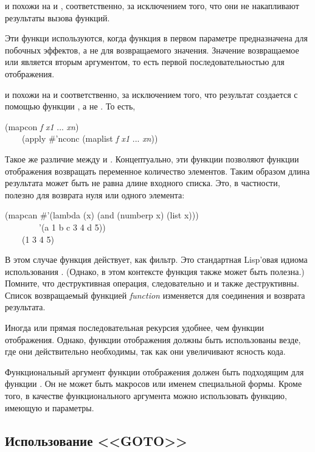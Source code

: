 \begin{defun}[Function]
 и  похожи на  и , соответственно,
за исключением того, что они не накапливают результаты вызова функций.

Эти функци используются, когда функция в первом параметре предназначена для
побочных эффектов, а не для возвращаемого значения.
Значение возвращаемое  или  является вторым аргументом, то
есть первой последовательностью для отображения.

 и  похожи на  и 
соответственно, за исключением того, что результат создается с помощью функции
, а не . То есть, 
\begin{lisp}
(mapcon \emph{f} \emph{x1} ... \emph{xn}) \\
~~~\EQ\ (apply \#'nconc (maplist \emph{f} \emph{x1} ... \emph{xn}))
\end{lisp}
Такое же различие между  и .
Концептуально, эти функции позволяют функции отображения возвращать переменное
количество элементов. Таким образом длина результата может быть не равна длине
входного списка.
Это, в частности, полезно для возврата нуля или одного элемента:
\begin{lisp}
(mapcan \#'(lambda (x) (and (numberp x) (list x))) \\
~~~~~~~~'(a 1 b c 3 4 d 5)) \\
~~~\EV\ (1 3 4 5)
\end{lisp}
В этом случае функция действует, как фильтр. Это стандартная Lisp'овая идиома
использования .
(Однако, в этом контексте функция  также может быть полезна.)
Помните, что  деструктивная операция, следовательно и  и
 также деструктивны. Список возвращаемый функцией \emph{function}
изменяется для соединения и возврата результата.

Иногда  или прямая последовательная рекурсия удобнее, чем функции
отображения. Однако, функции отображения должны быть использованы везде, где они
действительно необходимы, так как они увеличивают ясность кода.

Функциональный аргумент функции отображения должен быть подходящим для функции
. Он не может быть макросов или именем специальной формы.
Кроме того, в качестве функционального аргумента можно использовать функцию,
имеющую  и  параметры.
\end{defun}

\subsection{Использование <<GOTO>>}

